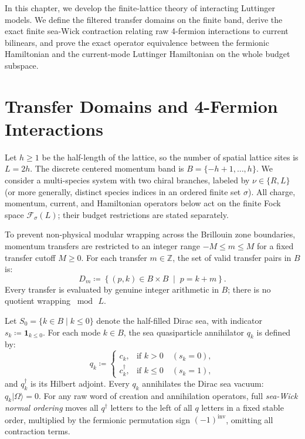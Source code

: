 In this chapter, we develop the finite-lattice theory of interacting Luttinger models. We define the filtered transfer domains on the finite band, derive the exact finite sea-Wick contraction relating raw 4-fermion interactions to current bilinears, and prove the exact operator equivalence between the fermionic Hamiltonian and the current-mode Luttinger Hamiltonian on the whole budget subspace.

\section{Transfer Domains and 4-Fermion Interactions}

Let $h \ge 1$ be the half-length of the lattice, so the number of spatial lattice sites is $L = 2h$. The discrete centered momentum band is $B = \{-h+1, \dots, h\}$. We consider a multi-species system with two chiral branches, labeled by $\nu \in \{R, L\}$ (or more generally, distinct species indices in an ordered finite set $\sigma$).
All charge, momentum, current, and Hamiltonian operators below act on the finite Fock space $\mathcal{F}_\sigma(L)$; their budget restrictions are stated separately.

\begin{definition}
To prevent non-physical modular wrapping across the Brillouin zone boundaries, momentum transfers are restricted to an integer range $-M \le m \le M$ for a fixed transfer cutoff $M \ge 0$.
For each transfer $m \in \mathbb{Z}$, the set of valid transfer pairs in $B$ is:
\begin{equation}
D_m \coloneqq \left\{ (p, k) \in B \times B \;\middle|\; p = k + m \right\}.
\end{equation}
Every transfer is evaluated by genuine integer arithmetic in $B$; there is no quotient wrapping $\bmod\, L$.
\end{definition}

\begin{definition}
Let $S_0 = \{k \in B \mid k \le 0\}$ denote the half-filled Dirac sea, with indicator $s_k \coloneqq \mathbf{1}_{k \le 0}$.
For each mode $k \in B$, the sea quasiparticle annihilator $q_k$ is defined by:
\begin{equation}
q_k \coloneqq \begin{cases} c_k, & \text{if } k > 0 \quad (s_k = 0), \\ c_k^\dagger, & \text{if } k \le 0 \quad (s_k = 1), \end{cases}
\end{equation}
and $q_k^\dagger$ is its Hilbert adjoint. Every $q_k$ annihilates the Dirac sea vacuum: $q_k |\Omega\rangle = 0$.
For any raw word of creation and annihilation operators, full \emph{sea-Wick normal ordering} moves all $q^\dagger$ letters to the left of all $q$ letters in a fixed stable order, multiplied by the fermionic permutation sign $(-1)^{\mathrm{inv}}$, omitting all contraction terms.
\end{definition}

